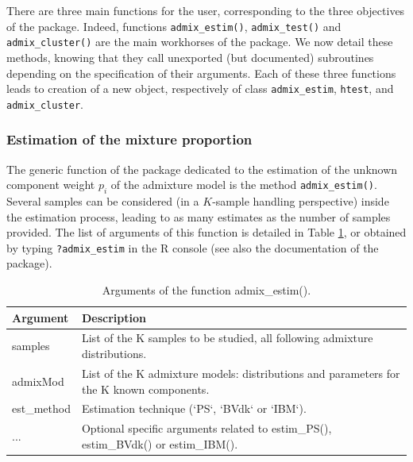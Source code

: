 There are three main functions for the user, corresponding to the three objectives of the package. Indeed, functions \texttt{admix\_estim()}, \texttt{admix\_test()} and \texttt{admix\_cluster()} are the main workhorses of the  package. We now detail these methods, knowing that they call unexported (but documented) subroutines depending on the specification of their arguments.
Each of these three functions leads to creation of a new object, respectively of class \texttt{admix\_estim}, \texttt{htest}, and \texttt{admix\_cluster}.

\subsubsection{Estimation of the mixture proportion}\label{estimation-of-the-mixture-proportion}

The generic function of the package dedicated to the estimation of the unknown component weight \(p_i\) of the admixture model is the method \texttt{admix\_estim()}. Several samples can be considered (in a \(K\)-sample handling perspective) inside the estimation process, leading to as many estimates as the number of samples provided. The list of arguments of this function is detailed in Table \ref{tab:admixEstimArgs-latex}, or obtained by typing \texttt{?admix\_estim} in the R console (see also the documentation of the package).

\begin{table}[!h]
\centering
\caption{\label{tab:admixEstimArgs-latex}Arguments of the function admix\_estim().}
\centering
\fontsize{8}{10}\selectfont
\begin{tabular}[t]{ll}
\toprule
Argument & Description\\
\midrule
samples & List of the K samples to be studied, all following admixture distributions.\\
admixMod & List of the K admixture models: distributions and parameters for the K known components.\\
est\_method & Estimation technique (`PS`, `BVdk` or `IBM`).\\
... & Optional specific arguments related to estim\_PS(), estim\_BVdk() or estim\_IBM().\\
\bottomrule
\end{tabular}
\end{table}

